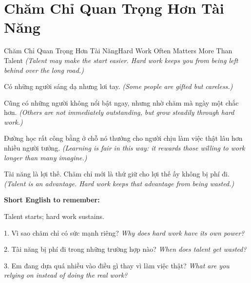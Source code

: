 \section{Chăm Chỉ Quan Trọng Hơn Tài Năng}
\begin{truyen}{Chăm Chỉ Quan Trọng Hơn Tài Năng}{Hard Work Often Matters More Than Talent}
\textit{(Talent may make the start easier. Hard work keeps you from being left behind over the long road.)}

Có những người sáng dạ nhưng lơi tay.
\textit{(Some people are gifted but careless.)}

Cũng có những người không nổi bật ngay, nhưng nhờ chăm mà ngày một chắc hơn.
\textit{(Others are not immediately outstanding, but grow steadily through hard work.)}

Đường học rất công bằng ở chỗ nó thưởng cho người chịu làm việc thật lâu hơn nhiều người tưởng.
\textit{(Learning is fair in this way: it rewards those willing to work longer than many imagine.)}
\end{truyen}

\begin{baihoc}
Tài năng là lợi thế. Chăm chỉ mới là thứ giữ cho lợi thế ấy không bị phí đi.
\textit{(Talent is an advantage. Hard work keeps that advantage from being wasted.)}
\end{baihoc}

\begin{ghinhoanh}
\textbf{Short English to remember:}

Talent starts; hard work sustains.

\end{ghinhoanh}

\begin{tuhocnhanh}
1. Vì sao chăm chỉ có sức mạnh riêng? \textit{Why does hard work have its own power?}

2. Tài năng bị phí đi trong những trường hợp nào? \textit{When does talent get wasted?}

3. Em đang dựa quá nhiều vào điều gì thay vì làm việc thật? \textit{What are you relying on instead of doing the real work?}
\end{tuhocnhanh}
\ngancach

